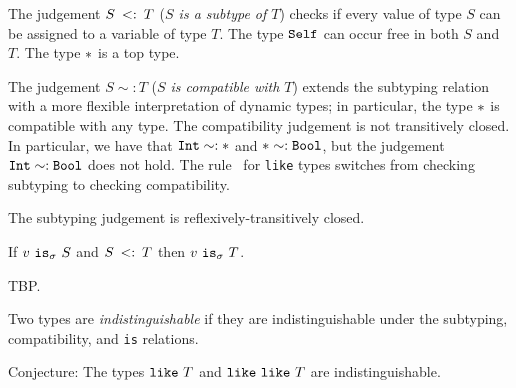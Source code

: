\documentclass{article}
\newcommand{\Int}{\t{Int}}
\newcommand{\Bool}{\t{Bool}}
\newcommand{\dynamic}{\t{*}}
\newcommand{\subtype}[2]{#1 \,\sword\, #2}
\newcommand{\sword}{\mbox{\,\,$<:$\,\,}}
\renewcommand{\t}[1]{{\tt #1}}
\newcommand{\likety}[1]{\t{like}~#1}
\newcommand{\compatible}[2]{#1 \sim: #2 }
\newcommand{\istype}[2]{#1~\t{is}_{\sigma}~ #2}
\newcommand{\self}{\t{Self}}
\begin{document}
The judgement $\subtype{S}{T}$ (\emph{$S$ is a subtype of $T$}) checks if every value of type $S$ 
can be assigned to a variable of type $T$. The type $\self$ can occur free in both $S$ and $T$.
The type $\dynamic$ is a top type. 

The judgement $\compatible{S}{T}$  (\emph{$S$ is compatible with $T$}) 
extends the subtyping relation with a more flexible interpretation of dynamic types; 
in particular, the type $\dynamic$ is compatible with any type.
The compatibility judgement is not transitively closed.
In particular, we have that   $\compatible{\Int}{\dynamic}$ and
$\compatible{\dynamic}{\Bool}$, but the judgement $\compatible{\Int}{\Bool}$ does not hold. 
The rule~ for \t{like} types switches from checking subtyping to checking compatibility.

\begin{lemma}
The subtyping judgement is reflexively-transitively closed.
\end{lemma}


\begin{lemma}
If $\istype v S$ and $\subtype S T$ then $\istype v T$.
\end{lemma}
TBP.

Two types are \emph{indistinguishable} if they are indistinguishable under the subtyping,  compatibility, and \t{is} relations.

Conjecture: The types $\likety{T}$ and $\likety \likety T$ are indistinguishable.
\end{document}

